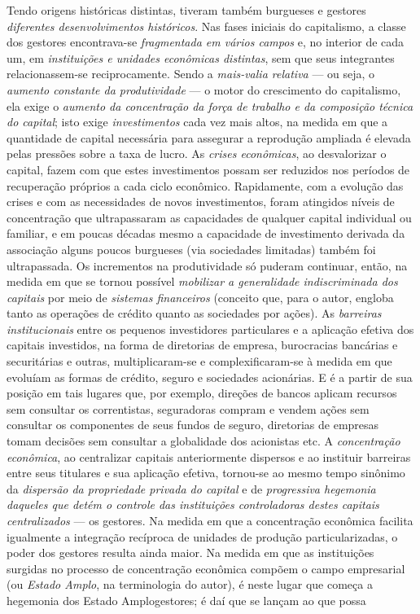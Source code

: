 Tendo origens históricas distintas, tiveram também burgueses e gestores \textit{diferentes desenvolvimentos históricos}. Nas fases iniciais do capitalismo, a classe dos gestores encontrava-se \textit{fragmentada em vários campos} e, no interior de cada um, em \textit{instituições e unidades econômicas distintas}, sem que seus integrantes relacionassem-se reciprocamente. Sendo a \textit{mais-valia relativa} --- ou seja, o \textit{aumento constante da produtividade} --- o motor do crescimento do capitalismo, ela exige o \textit{aumento da concentração da força de trabalho e da composição técnica do capital}; isto exige \textit{investimentos} cada vez mais altos, na medida em que a quantidade de capital necessária para assegurar a reprodução ampliada é elevada pelas pressões sobre a taxa de lucro. As \textit{crises econômicas}, ao desvalorizar o capital, fazem com que estes investimentos possam ser reduzidos nos períodos de recuperação próprios a cada ciclo econômico. Rapidamente, com a evolução das crises e com as necessidades de novos investimentos, foram atingidos níveis de concentração que ultrapassaram as capacidades de qualquer capital individual ou familiar, e em poucas décadas mesmo a capacidade de investimento derivada da associação alguns poucos burgueses (via sociedades limitadas) também foi ultrapassada. Os incrementos na produtividade só puderam continuar, então, na medida em que se tornou possível \textit{mobilizar a generalidade indiscriminada dos capitais} por meio de \textit{sistemas financeiros} (conceito que, para o autor, engloba tanto as operações de crédito quanto as sociedades por ações). As \textit{barreiras institucionais} entre os pequenos investidores particulares e a aplicação efetiva dos capitais investidos, na forma de diretorias de empresa, burocracias bancárias e securitárias e outras, multiplicaram-se e complexificaram-se à medida em que evoluíam as formas de crédito, seguro e sociedades acionárias. E é a partir de sua posição em tais lugares que, por exemplo, direções de bancos aplicam recursos sem consultar os correntistas, seguradoras compram e vendem ações sem consultar os componentes de seus fundos de seguro, diretorias de empresas tomam decisões sem consultar a globalidade dos acionistas etc. A \textit{concentração econômica}, ao centralizar capitais anteriormente dispersos e ao instituir barreiras entre seus titulares e sua aplicação efetiva, tornou-se ao mesmo tempo sinônimo da \textit{dispersão da propriedade privada do capital} e de \textit{progressiva hegemonia daqueles que detém o controle das instituições controladoras destes capitais centralizados} --- os gestores. Na medida em que a concentração econômica facilita igualmente a integração recíproca de unidades de produção particularizadas, o poder dos gestores resulta ainda maior. Na medida em que as instituições surgidas no processo de concentração econômica compõem o campo empresarial (ou \textit{Estado Amplo}, na terminologia do autor), é neste lugar que começa a hegemonia dos Estado Amplogestores; é daí que se lançam ao que possa 